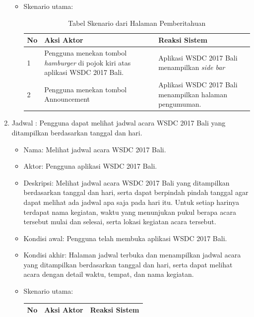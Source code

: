 \begin{enumerate}
\begin{itemize}
		\item Skenario utama: \\
		\begin{table}[H]
			\centering
			\begin{tabular}{|p{0.5cm}|p{7cm}|p{7cm}|}
				\hline
				No & Aksi Aktor                               & Reaksi Sistem                                          \\ \hline
				1  & Pengguna menekan tombol {\it hamburger} di pojok kiri atas aplikasi WSDC 2017 Bali. & Aplikasi WSDC 2017 Bali menampilkan {\it side bar} \\ \hline
				2  & Pengguna menekan tombol Announcement & Aplikasi WSDC 2017 Bali menampilkan halaman pengumuman. \\ \hline
			\end{tabular}
			\caption{Tabel Skenario dari Halaman Pemberitahuan}
			\label{table:skenarioHalamanPemberitahuan}
		\end{table}
	\end{itemize}
	\item Jadwal : Pengguna dapat melihat jadwal acara WSDC 2017 Bali yang ditampilkan berdasarkan tanggal dan hari.
	\begin{itemize}
		\item Nama: Melihat jadwal acara WSDC 2017 Bali.
		\item Aktor: Pengguna aplikasi WSDC 2017 Bali.
		\item Deskripsi: Melihat jadwal acara WSDC 2017 Bali yang ditampilkan berdasarkan tanggal dan hari, serta dapat berpindah pindah tanggal agar dapat melihat ada jadwal apa saja pada hari itu. Untuk setiap harinya terdapat nama kegiatan, waktu yang menunjukan pukul berapa acara tersebut mulai dan selesai, serta lokasi kegiatan acara tersebut.
		\item Kondisi awal: Pengguna telah membuka aplikasi WSDC 2017 Bali.
		\item Kondisi akhir: Halaman jadwal terbuka dan menampilkan jadwal acara yang ditampilkan berdasarkan tanggal dan hari, serta dapat melihat acara dengan detail waktu, tempat, dan nama kegiatan.
		\item Skenario utama: \\
		\begin{table}[H]
			\centering
			\begin{tabular}{|p{0.5cm}|p{7cm}|p{7cm}|}
				\hline
				No & Aksi Aktor                               & Reaksi Sistem                                          \\ \hline

\end{tabular}
\end{table}
\end{itemize}
\end{enumerate}
